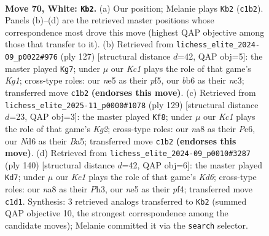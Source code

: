 \documentclass[11pt]{article}
\begin{document}
\clearpage

\begin{figure}[p]\centering
\begin{subfigure}{0.46\textwidth}\centering
\resizebox{\linewidth}{!}{%
\newchessgame
\chessboard[
  setfen={n7/6k1/1b1N4/p3n3/P2pP3/1P5p/2B1P3/2K5 w - - 6 70},
  showmover=false,
  pgfstyle=straightmove, color=movearrow, markmove={c1-b2}
]}
\caption{}
\end{subfigure}\hfill
\begin{subfigure}{0.46\textwidth}\centering
\resizebox{\linewidth}{!}{%
\newchessgame
\chessboard[
  setfen={6k1/4bp2/3p4/2pP1Pp1/2P5/2NK4/1B6/8 b - - 2 64},
  showmover=false,
  pgfstyle=straightmove, color=movearrow, markmove={g8-g7}
]}
\caption{}
\end{subfigure}
\\[4pt]
\begin{subfigure}{0.46\textwidth}\centering
\resizebox{\linewidth}{!}{%
\newchessgame
\chessboard[
  setfen={8/6k1/N3p2p/bn1bN1p1/4p3/6PP/1B3P2/5K2 b - - 0 65},
  showmover=false,
  pgfstyle=straightmove, color=movearrow, markmove={g7-f8}
]}
\caption{}
\end{subfigure}\hfill
\begin{subfigure}{0.46\textwidth}\centering
\resizebox{\linewidth}{!}{%
\newchessgame
\chessboard[
  setfen={8/k7/2BK4/p5p1/P4pPb/5P1P/8/8 w - - 31 71},
  showmover=false,
  pgfstyle=straightmove, color=movearrow, markmove={d6-d7}
]}
\caption{}
\end{subfigure}
\caption{\textbf{Move 70, White: \texttt{Kb2}.} (a) Our position; Melanie plays \texttt{Kb2} (\texttt{c1b2}). Panels (b)--(d) are the retrieved master positions whose correspondence most drove this move (highest QAP objective among those that transfer to it). (b) Retrieved from \texttt{lichess\_elite\_2024-09\_p0022\#976} (ply 127) [structural distance $d$=42, QAP obj=5]: the master played \texttt{Kg7}; under $\mu$ our \emph{Kc1} plays the role of that game's \emph{Kg1}; cross-type roles: our \emph{n}e5 as their \emph{p}f5, our \emph{b}b6 as their \emph{n}c3; transferred move \texttt{c1b2} \textbf{(endorses this move)}. (c) Retrieved from \texttt{lichess\_elite\_2025-11\_p0000\#1078} (ply 129) [structural distance $d$=23, QAP obj=3]: the master played \texttt{Kf8}; under $\mu$ our \emph{Kc1} plays the role of that game's \emph{Kg2}; cross-type roles: our \emph{n}a8 as their \emph{P}e6, our \emph{N}d6 as their \emph{B}a5; transferred move \texttt{c1b2} \textbf{(endorses this move)}. (d) Retrieved from \texttt{lichess\_elite\_2024-09\_p0010\#3287} (ply 140) [structural distance $d$=42, QAP obj=6]: the master played \texttt{Kd7}; under $\mu$ our \emph{Kc1} plays the role of that game's \emph{Kd6}; cross-type roles: our \emph{n}a8 as their \emph{P}h3, our \emph{n}e5 as their \emph{p}f4; transferred move \texttt{c1d1}. Synthesis: 3 retrieved analogs transferred to \texttt{Kb2} (summed QAP objective 10, the strongest correspondence among the candidate moves); Melanie committed it via the \texttt{search} selector.}
\label{fig:thought-m138}
\end{figure}
\end{document}
